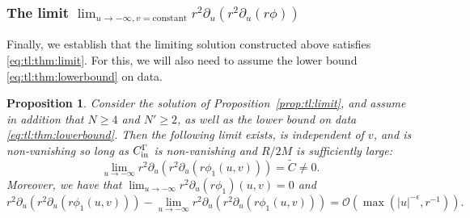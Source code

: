\documentclass[11pt,english]{article}
\numberwithin{equation}{section}
\theoremstyle{remark}
\theoremstyle{plain}
\newtheorem{prop}{Proposition}[section]
\theoremstyle{remark}
\newcommand{\pu}{\partial_u}
\renewcommand{\(}{\left(}
\renewcommand{\)}{\right)}
\begin{document}
\subsubsection{The limit \texorpdfstring{$\lim_{u\to-\infty,v=\text{constant}}r^2\pu\left(r^2\pu(r\phi)\right)$}{lim (r2 d/du (r2 d/du(r phi1)))}}\label{sec:tl:limitsub}
Finally, we establish that the limiting solution constructed above satisfies \eqref{eq:tl:thm:limit}. For this, we will also need to assume the lower bound  \eqref{eq:tl:thm:lowerbound} on data.
\begin{prop}\label{prop:limit}
Consider the solution of Proposition~\ref{prop:tl:limit}, and assume in addition that $N\geq 4$ and $N'\geq2$, as well as the lower bound on data \eqref{eq:tl:thm:lowerbound}. Then  the following limit exists, is independent of $v$, and is non-vanishing so long as $C_{\mathrm{in}}^\Gamma$ is non-vanishing and $R/2M$ is sufficiently large:
\begin{equation}\label{eq:prop8limit1}
\lim_{u\to -\infty}r^2\pu\left(r^2\pu(r\phi_1(u,v))\right)=\tilde C\neq 0. %
\end{equation}
Moreover, we have that $\lim_{u\to-\infty}r^2\pu(r\phi_1)(u,v)=0$ and
\begin{equation}\label{eq:prop8limit2}
r^2\pu\left(r^2\pu(r\phi_1(u,v))\right)-\lim_{u\to-\infty}r^2\pu\left(r^2\pu(r\phi_1(u,v))\right)=\mathcal{O}(\max(|u|^{-\epsilon},r^{-1})).
\end{equation}
\end{prop}
\end{document}
